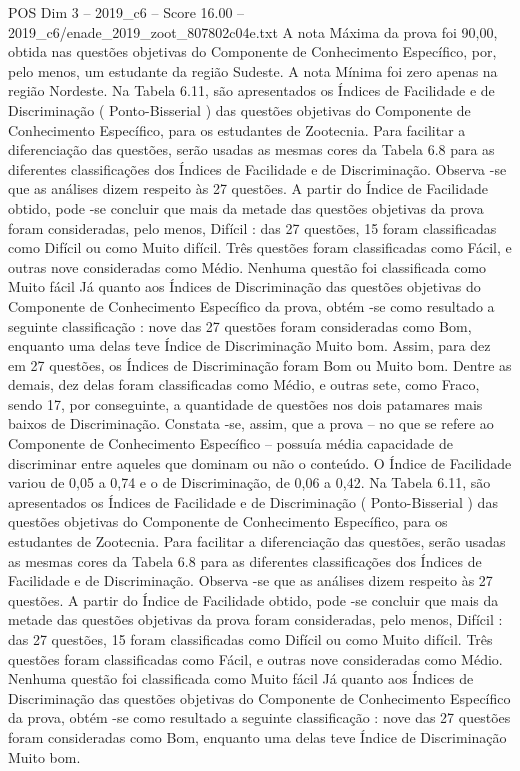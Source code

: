 \begin{textsample}{POS Dim 3 – 2019\_c6 – Score 16.00 – 2019\_c6/enade\_2019\_zoot\_807802c04e.txt}
A nota Máxima da prova foi 90,00, obtida nas questões objetivas do Componente de Conhecimento Específico, por, pelo menos, um estudante da região Sudeste.
A nota Mínima foi zero apenas na região Nordeste.
Na Tabela 6.11, são apresentados os Índices de Facilidade e de Discriminação ( Ponto-Bisserial ) das questões objetivas do Componente de Conhecimento Específico, para os estudantes de Zootecnia.
Para facilitar a diferenciação das questões, serão usadas as mesmas cores da Tabela 6.8 para as diferentes classificações dos Índices de Facilidade e de Discriminação.
Observa -se que as análises dizem respeito às 27 questões.
A partir do Índice de Facilidade obtido, pode -se concluir que mais da metade das questões objetivas da prova foram consideradas, pelo menos, Difícil : das 27 questões, 15 foram classificadas como Difícil ou como Muito difícil.
Três questões foram classificadas como Fácil, e outras nove consideradas como Médio.
Nenhuma questão foi classificada como Muito fácil Já quanto aos Índices de Discriminação das questões objetivas do Componente de Conhecimento Específico da prova, obtém -se como resultado a seguinte classificação : nove das 27 questões foram consideradas como Bom, enquanto uma delas teve Índice de Discriminação Muito bom.
Assim, para dez em 27 questões, os Índices de Discriminação foram Bom ou Muito bom.
Dentre as demais, dez delas foram classificadas como Médio, e outras sete, como Fraco, sendo 17, por conseguinte, a quantidade de questões nos dois patamares mais baixos de Discriminação.
Constata -se, assim, que a prova – no que se refere ao Componente de Conhecimento Específico – possuía média capacidade de discriminar entre aqueles que dominam ou não o conteúdo.
O Índice de Facilidade variou de 0,05 a 0,74 e o de Discriminação, de 0,06 a 0,42.
Na Tabela 6.11, são apresentados os Índices de Facilidade e de Discriminação ( Ponto-Bisserial ) das questões objetivas do Componente de Conhecimento Específico, para os estudantes de Zootecnia.
Para facilitar a diferenciação das questões, serão usadas as mesmas cores da Tabela 6.8 para as diferentes classificações dos Índices de Facilidade e de Discriminação.
Observa -se que as análises dizem respeito às 27 questões.
A partir do Índice de Facilidade obtido, pode -se concluir que mais da metade das questões objetivas da prova foram consideradas, pelo menos, Difícil : das 27 questões, 15 foram classificadas como Difícil ou como Muito difícil.
Três questões foram classificadas como Fácil, e outras nove consideradas como Médio.
Nenhuma questão foi classificada como Muito fácil Já quanto aos Índices de Discriminação das questões objetivas do Componente de Conhecimento Específico da prova, obtém -se como resultado a seguinte classificação : nove das 27 questões foram consideradas como Bom, enquanto uma delas teve Índice de Discriminação Muito bom.

\end{textsample}
